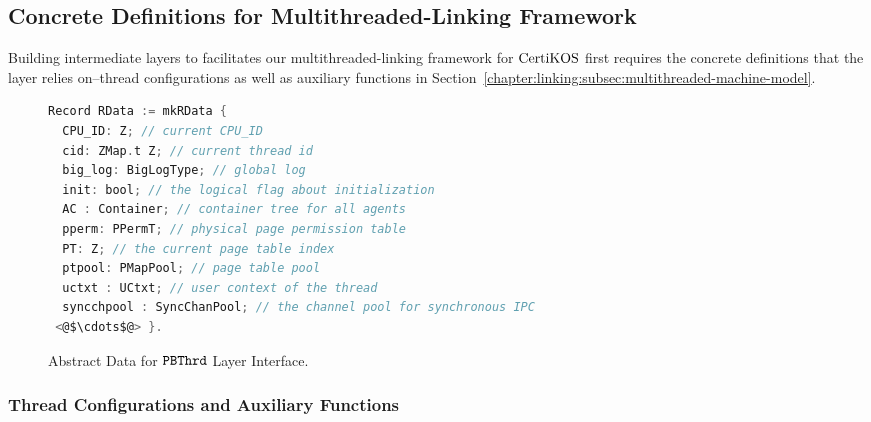 \subsection{Concrete Definitions for Multithreaded-Linking Framework} 
\label{chapter:certikos:phbthread}

Building intermediate layers to facilitates our multithreaded-linking framework 
for $\mathrm{CertiKOS}$ first requires the concrete definitions 
that the layer relies on--thread configurations as well as auxiliary functions in Section~\ref{chapter:linking:subsec:multithreaded-machine-model}.

\begin{figure}
\begin{lstlisting}[language=C]
Record RData := mkRData {
  CPU_ID: Z; // current CPU_ID 
  cid: ZMap.t Z; // current thread id
  big_log: BigLogType; // global log
  init: bool; // the logical flag about initialization
  AC : Container; // container tree for all agents
  pperm: PPermT; // physical page permission table 
  PT: Z; // the current page table index
  ptpool: PMapPool; // page table pool
  uctxt : UCtxt; // user context of the thread
  syncchpool : SyncChanPool; // the channel pool for synchronous IPC
 <@$\cdots$@> }.
\end{lstlisting}
\caption{Abstract Data for  ${{\mathrm{\texttt{PBThrd}}}}$ Layer Interface.}
\label{fig:chapter:certikos:abstract-data-for-pbthread-layer}
\end{figure}



\subsubsection{Thread Configurations and Auxiliary Functions}

